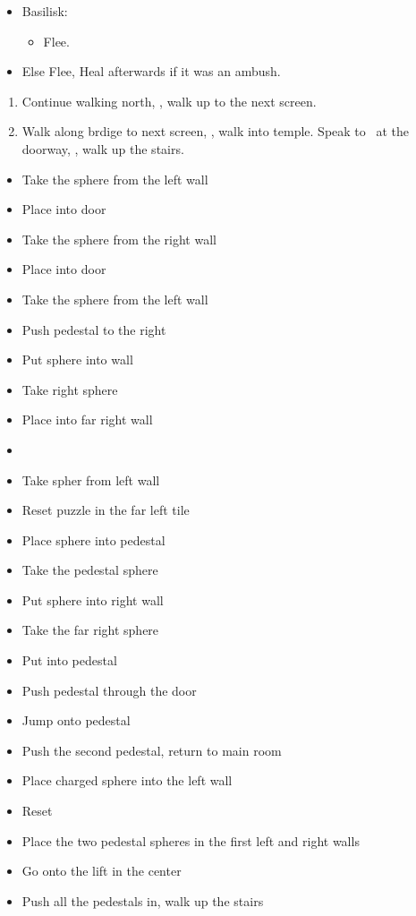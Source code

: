 \begin{encounters}
	\begin{itemize}
		\item Basilisk:
		\begin{itemize}
			\kimahrif Lancet Basilisk, learn \textbf{Stone Breath}
			\item Flee.
		\end{itemize}
		\item Else Flee,  Heal afterwards if it was an ambush.
	\end{itemize}
\end{encounters}
\begin{enumerate}[resume]
	\item Continue walking north, \sd, walk up to the next screen.
	\item Walk along brdige to next screen, \sd, walk into temple. Speak to \auron\ at the doorway, \sd, walk up the stairs.
\end{enumerate}
\begin{trial}
\begin{itemize}
	\item Take the sphere from the left wall
	\item Place into door
	\item Take the sphere from the right wall
	\item Place into door
	\item Take the sphere from the left wall
	\item Push pedestal to the right
	\item Put sphere into wall
	\item Take right sphere
	\item Place into far right wall
	\item \cs
	\item Take spher from left wall
	\item Reset puzzle in the far left tile
	\item Place sphere into pedestal
	\item Take the pedestal sphere
	\item Put sphere into right wall
	\item Take the far right sphere
	\item Put into pedestal
	\item Push pedestal through the door
	\item Jump onto pedestal
	\item Push the second pedestal, return to main room
	\item Place charged sphere into the left wall
	\item Reset
	\item Place the two pedestal spheres in the first left and right walls
	\item Go onto the lift in the center
	\item Push all the pedestals in, walk up the stairs
\end{itemize}
\end{trial}
